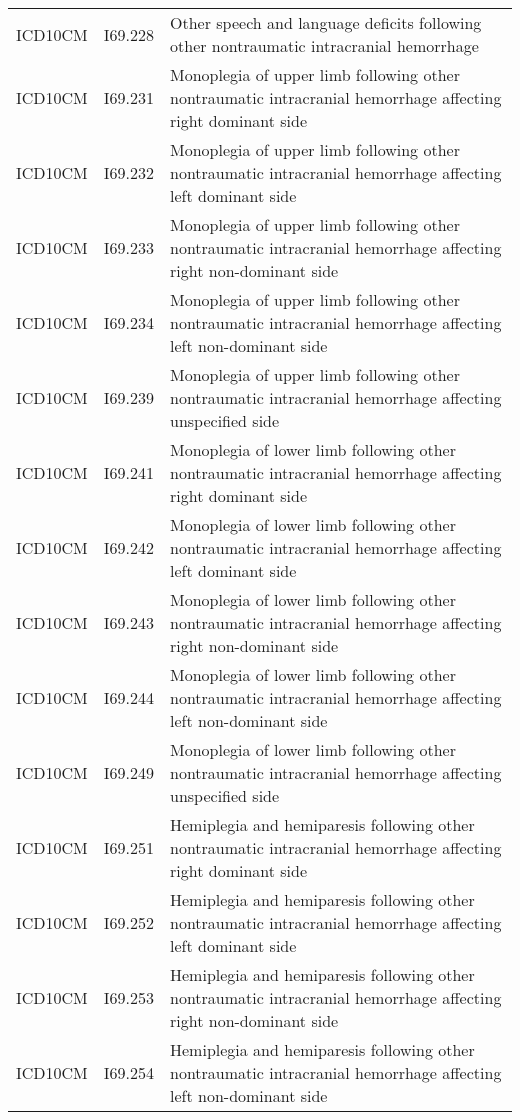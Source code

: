 \begin{longtable}{p{}p{}p{}}
  ICD10CM & I69.228 & Other speech and language deficits following other nontraumatic intracranial hemorrhage \\ 
  ICD10CM & I69.231 & Monoplegia of upper limb following other nontraumatic intracranial hemorrhage affecting right dominant side \\ 
  ICD10CM & I69.232 & Monoplegia of upper limb following other nontraumatic intracranial hemorrhage affecting left dominant side \\ 
  ICD10CM & I69.233 & Monoplegia of upper limb following other nontraumatic intracranial hemorrhage affecting right non-dominant side \\ 
  ICD10CM & I69.234 & Monoplegia of upper limb following other nontraumatic intracranial hemorrhage affecting left non-dominant side \\ 
  ICD10CM & I69.239 & Monoplegia of upper limb following other nontraumatic intracranial hemorrhage affecting unspecified side \\ 
  ICD10CM & I69.241 & Monoplegia of lower limb following other nontraumatic intracranial hemorrhage affecting right dominant side \\ 
  ICD10CM & I69.242 & Monoplegia of lower limb following other nontraumatic intracranial hemorrhage affecting left dominant side \\ 
  ICD10CM & I69.243 & Monoplegia of lower limb following other nontraumatic intracranial hemorrhage affecting right non-dominant side \\ 
  ICD10CM & I69.244 & Monoplegia of lower limb following other nontraumatic intracranial hemorrhage affecting left non-dominant side \\ 
  ICD10CM & I69.249 & Monoplegia of lower limb following other nontraumatic intracranial hemorrhage affecting unspecified side \\ 
  ICD10CM & I69.251 & Hemiplegia and hemiparesis following other nontraumatic intracranial hemorrhage affecting right dominant side \\ 
  ICD10CM & I69.252 & Hemiplegia and hemiparesis following other nontraumatic intracranial hemorrhage affecting left dominant side \\ 
  ICD10CM & I69.253 & Hemiplegia and hemiparesis following other nontraumatic intracranial hemorrhage affecting right non-dominant side \\ 
  ICD10CM & I69.254 & Hemiplegia and hemiparesis following other nontraumatic intracranial hemorrhage affecting left non-dominant side \\ 

\end{longtable}
